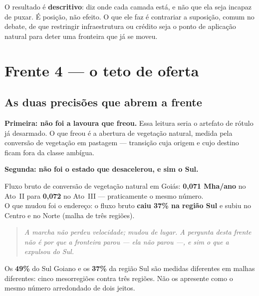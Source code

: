 \begin{naodiz}
O resultado é \textbf{descritivo}: diz onde cada camada está, e não que ela seja
incapaz de puxar. É posição, não efeito. O que ele faz é contrariar a suposição,
comum no debate, de que restringir infraestrutura ou crédito seja o ponto de
aplicação natural para deter uma fronteira que já se moveu.
\end{naodiz}

\chapter{Frente 4 --- o teto de oferta}

\section{As duas precisões que abrem a frente}

\textbf{Primeira: não foi a lavoura que freou.} Essa leitura seria o artefato de
rótulo já desarmado. O que freou é a abertura de vegetação natural, medida pela
conversão de vegetação em pastagem --- transição cuja origem e cujo destino
ficam fora da classe ambígua.

\textbf{Segunda: não foi o estado que desacelerou, e sim o Sul.}

\begin{ancora}
Fluxo bruto de conversão de vegetação natural em Goiás: \textbf{0,071 Mha/ano}
no Ato~II para \textbf{0,072} no Ato~III --- praticamente o mesmo número. \\
O que mudou foi o endereço: o fluxo bruto \textbf{caiu 37\% na região Sul} e
subiu no Centro e no Norte (malha de três regiões).
\end{ancora}

\begin{quote}\itshape\color{cortinta}
A marcha não perdeu velocidade; mudou de lugar. A pergunta desta frente não é
por que a fronteira parou --- ela não parou ---, e sim o que a expulsou do Sul.
\end{quote}

\begin{armadilha}
Os \textbf{49\%} do Sul Goiano e os \textbf{37\%} da região Sul são medidas
diferentes em malhas diferentes: cinco mesorregiões contra três regiões. Não os
apresente como o mesmo número arredondado de dois jeitos.
\end{armadilha}

